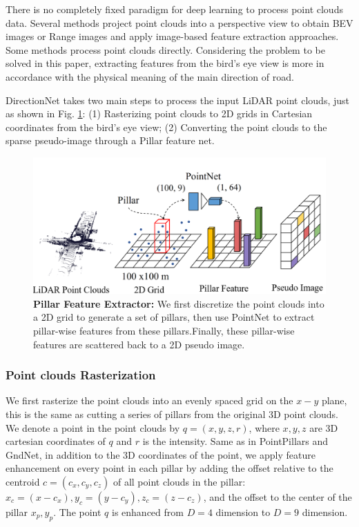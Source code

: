 \documentclass[letterpaper,10 pt,conference]{ieeeconf}  %
\begin{document}
There is no completely fixed paradigm for deep learning to process point clouds data. Several methods project point clouds into a perspective view to obtain BEV images or Range images\cite{34,35} and apply image-based feature extraction approaches. Some methods process point clouds directly\cite{36}. Considering the problem to be solved in this paper, extracting features from the bird's eye view\cite{12} is more in accordance with the physical meaning of the main direction of road.

DirectionNet takes two main steps to process the input LiDAR point clouds, just as shown in Fig. \ref{pfe}: (1) Rasterizing point clouds to 2D grids in Cartesian coordinates from the bird's eye view; (2) Converting the point clouds to the sparse pseudo-image through a Pillar feature net.

\begin{figure} 
    \centering
    \setlength{\belowcaptionskip}{-0.7cm}
    \includegraphics[width=\linewidth]{../imgs/pillar_feature_ex.png}
    \caption{\textbf{Pillar Feature Extractor:} We first discretize the point clouds into a 2D grid to generate a set of pillars, then use PointNet to extract pillar-wise features from these pillars.Finally, these pillar-wise features are scattered back to a 2D pseudo image.} 
    \label{pfe}
\end{figure}

\subsubsection{Point clouds Rasterization}
We first rasterize the point clouds into an evenly spaced grid on the $x-y$ plane, this is the same as cutting a series of pillars from the original 3D point clouds. We denote a point in the point clouds by $q=(x,y,z,r)$, where $x, y, z$ are 3D cartesian coordinates of $q$ and $r$ is the intensity. Same as in PointPillars\cite{12} and GndNet\cite{GND}, in addition to the 3D coordinates of the point, we apply feature enhancement on every point in each pillar by adding the offset relative to the centroid $c=(c_x,c_y,c_z)$ of all point clouds in the pillar: $x_c=(x-c_x), y_c=(y-c_y), z_c=(z-c_z)$, and the offset to the center of the pillar $x_p,y_p$. The point $q$ is enhanced from $D=4$ dimension to $D=9$ dimension.
\end{document}
